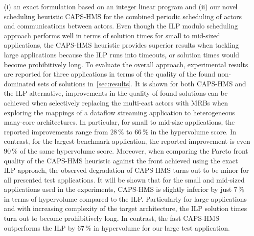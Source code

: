 (i) an exact formulation based on an integer linear program and (ii) our novel scheduling heuristic \ac{CAPS-HMS} for the combined periodic scheduling of actors and communications between actors.
Even though the \ac{ILP} modulo scheduling approach performs well in terms of solution times for small to mid-sized applications, the \ac{CAPS-HMS} heuristic provides superior results when tackling large applications because the \ac{ILP} runs into timeouts, or solution times would become prohibitively long.
To evaluate the overall approach, experimental results are reported for three applications in terms of the quality of the found non-dominated sets of solutions in~\cref{sec:results}.
It is shown for both \ac{CAPS-HMS} and the \ac{ILP} alternative, improvements in the quality of found solutions can be achieved when selectively replacing the multi-cast actors with \acp{MRB} when exploring the mappings of a dataflow streaming application to heterogeneous many-core architectures.
In particular, for small to mid-size applications, the reported improvements range from $28\,\%$ to $66\,\%$ in the hypervolume score.
In contrast, for the largest benchmark application, the reported improvement is even $90\,\%$ of the same hypervolume score.
Moreover, when comparing the Pareto front quality of the \ac{CAPS-HMS} heuristic against the front achieved using the exact \ac{ILP} approach, the observed degradation of \ac{CAPS-HMS} turns out to be minor for all presented test applications.
It will be shown that for the small and mid-sized applications used in the experiments, \ac{CAPS-HMS} is slightly inferior by just $7\,\%$ in terms of hypervolume compared to the \ac{ILP}.
Particularly for large applications and with increasing complexity of the target architecture, the \ac{ILP} solution times turn out to become prohibitively long. 
In contrast, the fast \ac{CAPS-HMS} outperforms the \ac{ILP} by $67\,\%$ in hypervolume for our large test application.
